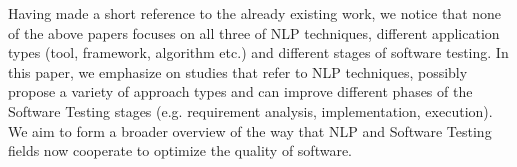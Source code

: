 Having made a short reference to the already existing work, we notice that none of the above papers focuses on all three of NLP techniques, different application types (tool, framework, algorithm etc.) and 
different stages of software testing. In this paper, we emphasize on studies that refer to NLP techniques, possibly propose a variety of approach types and can improve different phases 
of the Software Testing stages (e.g. requirement analysis, implementation, execution). We aim to form a broader overview of the way that NLP and Software Testing fields now cooperate to optimize 
the quality of software.